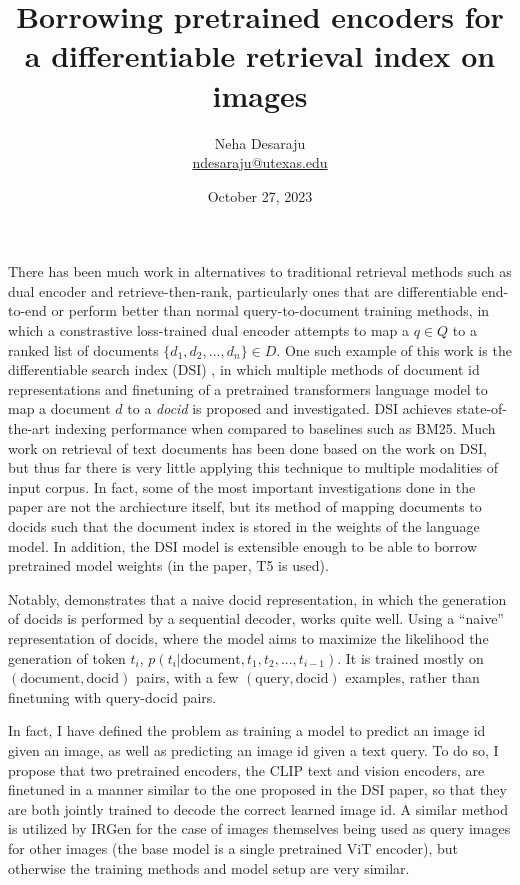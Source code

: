 \documentclass{article}
\title{Borrowing pretrained encoders for a differentiable retrieval index on images}
\author{Neha Desaraju \\ \href{mailto:ndesaraju@utexas.edu}{ndesaraju@utexas.edu}}
\date{October 27, 2023}
\begin{document}
\maketitle

There has been much work in alternatives to traditional retrieval methods such as dual encoder and retrieve-then-rank, particularly ones that are differentiable end-to-end or perform better than normal query-to-document training methods, in which a constrastive loss-trained dual encoder attempts to map a $q \in Q$ to a ranked list of documents $\{d_1, d_2, ..., d_n\} \in D$. One such example of this work is the differentiable search index (DSI) \cite{tay2022transformer}, in which multiple methods of document id representations and finetuning of a pretrained transformers language model to map a document $d$ to a \emph{docid} is proposed and investigated. DSI achieves state-of-the-art indexing performance when compared to baselines such as BM25. Much work on retrieval of text documents has been done based on the work on DSI, but thus far there is very little applying this technique to multiple modalities of input corpus. In fact, some of the most important investigations done in the paper are not the archiecture itself, but its method of mapping documents to docids such that the document index is stored in the weights of the language model. In addition, the DSI model is extensible enough to be able to borrow pretrained model weights (in the paper, T5 is used).

Notably, \cite{tay2022transformer} demonstrates that a naive docid representation, in which the generation of docids is performed by a sequential decoder, works quite well. Using a ``naive'' representation of docids, where the model aims to maximize the likelihood the generation of token $t_i$, $p(t_i|\text{document}, t_1, t_2, ..., t_{i-1})$. It is trained mostly on $(\text{document}, \text{docid})$ pairs, with a few $(\text{query}, \text{docid})$ examples, rather than finetuning with query-docid pairs.



In fact, I have defined the problem as training a model to predict an image id given an image, as well as predicting an image id given a text query. To do so, I propose that two pretrained encoders, the CLIP text and vision encoders, are finetuned in a manner similar to the one proposed in the DSI paper, so that they are both jointly trained to decode the correct learned image id. A similar method is utilized by IRGen \cite{zhang2023irgen} for the case of images themselves being used as query images for other images (the base model is a single pretrained ViT encoder), but otherwise the training methods and model setup are very similar.
\end{document}
